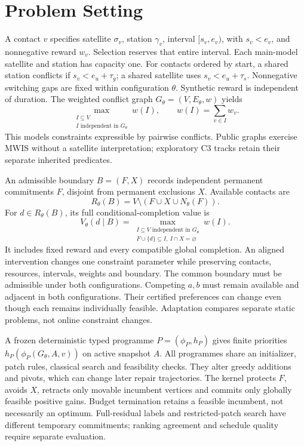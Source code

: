 \section{Problem Setting}
\label{sec:problem}
A contact $v$ specifies satellite $\sigma_v$, station $\gamma_v$, interval
$[s_v,e_v)$, with $s_v<e_v$, and nonnegative reward $w_v$. Selection reserves that entire
interval. Each main-model satellite and station has capacity one. For contacts
ordered by start, a shared station conflicts if $s_v<e_u+\tau_g$; a shared
satellite uses $s_v<e_u+\tau_s$. Nonnegative switching gaps are fixed within
configuration $\theta$. Synthetic reward is independent of duration.
The weighted conflict graph $G_\theta=(V,E_\theta,w)$ yields
\begin{equation}
 \max_{\substack{I\subseteq V\\ I\text{ independent in }G_\theta}} w(I),
 \qquad w(I)=\sum_{v\in I}w_v.
 \label{eq:mwis}
\end{equation}
This models constraints expressible by pairwise conflicts. Public graphs
exercise MWIS without a satellite interpretation; exploratory C3 tracks retain
their separate inherited predicates.

An admissible boundary $B=(F,X)$ records independent permanent commitments
$F$, disjoint from permanent exclusions $X$. Available contacts are
\begin{equation}
 R_\theta(B)=V\setminus(F\cup X\cup N_\theta(F)).
 \label{eq:residual}
\end{equation}
For $d\in R_\theta(B)$, its full conditional-completion value is
\begin{equation}
 V_\theta(d\mid B)=
 \max_{\substack{I\subseteq V\text{ independent in }G_\theta\\
                 F\cup\{d\}\subseteq I,\ I\cap X=\varnothing}}w(I).
 \label{eq:conditional-value}
\end{equation}
It includes fixed reward and every compatible global completion.
An aligned intervention changes one constraint parameter while preserving
contacts, resources, intervals, weights and boundary. The common boundary must
be admissible under both configurations. Competing $a,b$ must
remain available and adjacent in both configurations. Their certified
preferences can change even though each remains individually feasible.
Adaptation compares separate static problems, not online constraint changes.

A frozen deterministic typed programme $P=(\phi_P,h_P)$ gives finite priorities
$h_P(\phi_P(G_\theta,A,v))$ on active snapshot $A$.
All programmes share an initializer, patch rules, classical search and
feasibility checks. They alter greedy additions and pivots, which can change
later repair trajectories. The kernel protects $F$, avoids $X$, retracts only
movable incumbent vertices and commits only globally feasible positive gains.
Budget termination retains a feasible incumbent, not necessarily an optimum.
Full-residual labels and restricted-patch search have different temporary
commitments; ranking agreement and schedule quality require separate evaluation.
